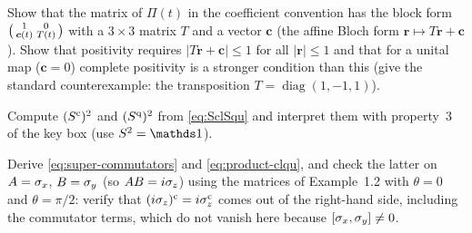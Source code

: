 \begin{exercise}\label{ex:1-3}
Show that the matrix of $\Pi(t)$ in the coefficient convention has the block form $\begin{psmallmatrix}1&0\\ \bm c(t)&T(t)\end{psmallmatrix}$ with a $3\times3$ matrix $T$ and a vector $\bm c$ (the affine Bloch form $\bm r\mapsto T\bm r+\bm c$).
Show that positivity requires $|T\bm r+\bm c|\le1$ for all $|\bm r|\le1$ and that for a unital map ($\bm c=0$) complete positivity is a stronger condition than this (give the standard counterexample: the transposition $T=\operatorname{diag}(1,-1,1)$).
\end{exercise}

\begin{exercise}\label{ex:1-4}
Compute $(S^{\mathrm{c}})^2$ and $(S^{\mathrm{q}})^2$ from \cref{eq:SclSqu} and interpret them with property~3 of the key box (use $S^2=\Id$).
\end{exercise}

\begin{exercise}\label{ex:1-5}
Derive \cref{eq:super-commutators} and \cref{eq:product-clqu}, and check the latter on $A=\sigma_x$, $B=\sigma_y$ (so $AB=i\sigma_z$) using the matrices of Example~1.2 with $\theta=0$ and $\theta=\pi/2$: verify that $(i\sigma_z)^{\mathrm{c}}=i\sigma_z^{\mathrm{c}}$ comes out of the right-hand side, including the commutator terms, which do not vanish here because $[\sigma_x,\sigma_y]\ne0$.
\end{exercise}

\clearpage
